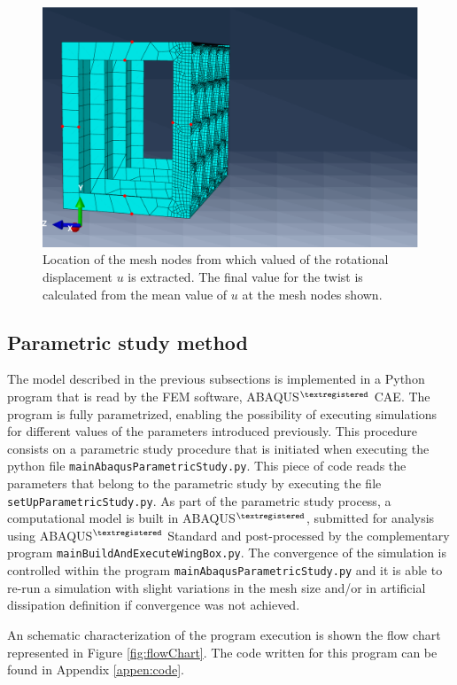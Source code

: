     \begin{figure}[!htpb]
      \centering
      \includegraphics[width=0.6 \textwidth]{figures/model/pointsToEvaluateTwist}
      \caption[Location of the mesh nodes from which valued of the rotational displacement $u$ is extracted]{Location of the mesh nodes from which valued of the rotational displacement $u$ is extracted. The final value for the twist is calculated from the mean value of $u$ at the mesh nodes shown.}
      \label{fig:pointsToEvaluateTwist}
    \end{figure}
  
  \subsection{Parametric study method} \label{subsec:parametricStudy_computationalModel}

    The model described in the previous subsections is implemented in a Python program that is read by the FEM software, ABAQUS$^{\textregistered}$ CAE. The program is fully parametrized, enabling the possibility of executing simulations for different values of the parameters introduced previously. This procedure consists on a parametric study procedure that is initiated when executing the python file \texttt{mainAbaqusParametricStudy.py}. This piece of code reads the parameters that belong to the parametric study by executing the file \texttt{setUpParametricStudy.py}. As part of the parametric study process, a computational model is built in ABAQUS$^{\textregistered}$, submitted for analysis using ABAQUS$^{\textregistered}$ Standard and post-processed by the complementary program \texttt{mainBuildAndExecuteWingBox.py}. The convergence of the simulation is controlled within the program \texttt{mainAbaqusParametricStudy.py} and it is able to re-run a simulation with slight variations in the mesh size and/or in artificial dissipation definition if convergence was not achieved. 

    An schematic characterization of the program execution is shown the flow chart represented in Figure \ref{fig:flowChart}. The code written for this program can be found in Appendix \ref{appen:code}. 

